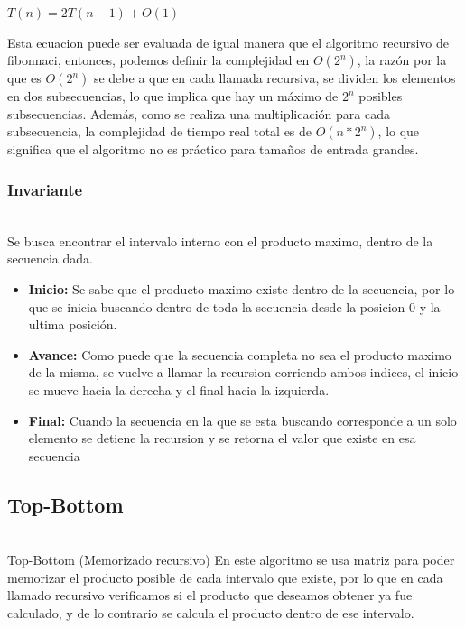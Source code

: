 \documentclass[11pt]{article}
\providecommand{\tightlist}{%
      \setlength{\itemsep}{0pt}\setlength{\parskip}{0pt}}
\begin{document}
\(T(n) = 2T(n-1) + O(1)\)

Esta ecuacion puede ser evaluada de igual manera que el algoritmo
recursivo de fibonnaci, entonces, podemos definir la complejidad en
\(O(2^n)\), la razón por la que es \(O(2^n)\) se debe a que en cada
llamada recursiva, se dividen los elementos en dos subsecuencias, lo que
implica que hay un máximo de \(2^n\) posibles subsecuencias. Además,
como se realiza una multiplicación para cada subsecuencia, la
complejidad de tiempo real total es de \(O(n * 2^n)\), lo que significa
que el algoritmo no es práctico para tamaños de entrada grandes.
\hypertarget{Invariante}{%
\subsubsection{Invariante}\label{complejidad}} \\



Se busca encontrar el intervalo interno con el producto maximo, dentro
de la secuencia dada.

\begin{itemize}
\tightlist
\item
  \textbf{Inicio:} Se sabe que el producto maximo existe dentro de la
  secuencia, por lo que se inicia buscando dentro de toda la secuencia
  desde la posicion 0 y la ultima posición.
\item
  \textbf{Avance:} Como puede que la secuencia completa no sea el
  producto maximo de la misma, se vuelve a llamar la recursion corriendo
  ambos indices, el inicio se mueve hacia la derecha y el final hacia la
  izquierda.
\item
  \textbf{Final:} Cuando la secuencia en la que se esta buscando
  corresponde a un solo elemento se detiene la recursion y se retorna el
  valor que existe en esa secuencia
\end{itemize}

\hypertarget{Top-Bottom }{%
\subsection{Top-Bottom}\label{recursivo}}
\\
Top-Bottom (Memorizado recursivo) En este algoritmo se usa matriz para
poder memorizar el producto posible de cada intervalo que existe, por lo
que en cada llamado recursivo verificamos si el producto que deseamos
obtener ya fue calculado, y de lo contrario se calcula el producto
dentro de ese intervalo.
\end{document}
